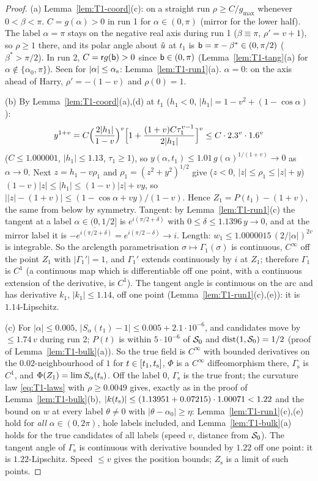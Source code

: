 \begin{proof}
(a) Lemma~\ref{lem:T1-coord}(c): on a straight run $\rho\ge C/g_{\max}$ whenever $0<\beta<\pi$. $C=g(\alpha)>0$ in run 1 for
$\alpha\in(0,\pi)$ (mirror for the lower half). The label $\alpha=\pi$ stays on the negative real axis during run 1 ($\beta\equiv\pi$,
$\rho'=v+1$), so $\rho\ge1$ there, and its polar angle about $\hat u$ at $t_1$ is $\mathsf b=\pi-\beta^*\in(0,\pi/2)$ ($\beta^*>\pi/2$). In run
2, $C=\mathsf r g(\mathsf b)>0$ since $\mathsf b\in(0,\pi)$ (Lemma~\ref{lem:T1-tang}(a) for $\alpha\notin\{\alpha_0,\pi\}$). Seen for
$|\alpha|\le\alpha_{\mathrm s}$: Lemma~\ref{lem:T1-run1}(a). $\alpha=0$: on the axis ahead of Harry, $\rho'=-(1-v)$ and $\rho(0)=1$.

(b) By Lemma~\ref{lem:T1-coord}(a),(d) at $t_1$ ($h_1<0$, $|h_1|=1-v^2+(1-\cos\alpha)$):
\[
y^{1+v}=C\Bigl(\frac{2|h_1|}{1-v}\Bigr)^v\Bigl[1+\frac{(1+v)C\tau_1^{v-1}}{2|h_1|}\Bigr]^v\le C\cdot2.3^v\cdot1.6^v
\]
($C\le1.000001$, $|h_1|\le1.13$, $\tau_1\ge1$), so $y(\alpha,t_1)\le1.01\,g(\alpha)^{1/(1+v)}\to0$ as $\alpha\to0$. Next $z=h_1-v\rho_1$
and $\rho_1=(z^2+y^2)^{1/2}$ give ($z<0$, $|z|\le\rho_1\le|z|+y$) $(1-v)|z|\le|h_1|\le(1-v)|z|+vy$, so
$\bigl||z|-(1+v)\bigr|\le(1-\cos\alpha+vy)/(1-v)$. Hence $Z_1=P(t_1)-(1+v)$, the same from below by symmetry. Tangent: by
Lemma~\ref{lem:T1-run1}(c) the tangent at a label $\alpha\in(0,1/2]$ is $e^{i(\pi/2+\delta)}$ with $0\le\delta\le1.1396\,y\to0$, and at the
mirror label it is $-\overline{e^{i(\pi/2+\delta)}}=e^{i(\pi/2-\delta)}\to i$. Length: $w_1\le1.0000015\,(2/|\alpha|)^{2v}$ is integrable.
So the arclength parametrisation $\sigma\mapsto\Gamma_1(\sigma)$ is continuous, $C^\infty$ off the point $Z_1$ with $|\Gamma_1'|=1$, and
$\Gamma_1'$ extends continuously by $i$ at $Z_1$; therefore $\Gamma_1$ is $C^1$ (a continuous map which is differentiable off one point,
with a continuous extension of the derivative, is $C^1$). The tangent angle is continuous on the arc and has derivative $k_1$,
$|k_1|\le1.14$, off one point (Lemma~\ref{lem:T1-run1}(c),(e)): it is $1.14$-Lipschitz.

(c) For $|\alpha|\le0.005$, $|S_\alpha(t_1)-1|\le0.005+2.1\cdot10^{-6}$, and candidates move by $\le1.74\,v$ during run 2; $P(t)$ is
within $5\cdot10^{-6}$ of $\mathcal S_0$ and $\operatorname{dist}(1,\mathcal S_0)=1/2$ (proof of Lemma~\ref{lem:T1-bulk}(a)). So the true field is
$C^\infty$ with bounded derivatives on the $0.02$-neighbourhood of $1$ for $t\in[t_1,t_{\mathrm s}]$, $\Phi$ is a $C^\infty$ diffeomorphism
there, $\Gamma_{\mathrm s}$ is $C^1$, and $\Phi(Z_1)=\lim S_\alpha(t_{\mathrm s})$. Off the label $0$, $\Gamma_{\mathrm s}$ is the true front; the
curvature law \eqref{eq:T1-laws} with $\rho\ge0.0049$ gives, exactly as in the proof of Lemma~\ref{lem:T1-bulk}(b),
$|k(t_{\mathrm s})|\le(1.13951+0.07215)\cdot1.00071<1.22$ and the bound on $w$ at every label $\theta\ne0$ with $|\theta-\alpha_0|\ge\eta$:
Lemma~\ref{lem:T1-run1}(c),(e) hold for \emph{all} $\alpha\in(0,2\pi)$, hole labels included, and Lemma~\ref{lem:T1-bulk}(a) holds for
the true candidates of all labels (speed $v$, distance from $\mathcal S_0$). The tangent angle of $\Gamma_{\mathrm s}$ is continuous with
derivative bounded by $1.22$ off one point: it is $1.22$-Lipschitz. Speed $\le v$ gives the position bounds; $Z_{\mathrm s}$ is a limit
of such points.


\end{proof}
